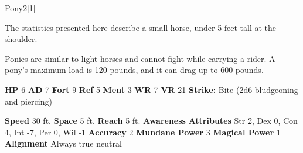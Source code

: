   \begin{monsection}{Pony}{2}[1]
    \vspace{-1em}\vspace{-1em}
    \vspace{0em}

    
      The statistics presented here describe a small horse, under 5 feet tall at the shoulder.
    
        Ponies are similar to light horses and cannot fight while carrying a rider.
        A pony's maximum load is 120 pounds, and it can drag up to 600 pounds.
      

    \begin{spellcontent}
      \begin{spelltargetinginfo}
        \pari \textbf{HP} 6 \monsep
          \textbf{AD} 7 \monsep
          \textbf{Fort} 9 \monsep
          \textbf{Ref} 5 \monsep
          \textbf{Ment} 3
        \pari \textbf{WR} 7 \monsep
        \textbf{VR} 21
        \pari \textbf{Strike:}
            Bite  (2d6 bludgeoning and piercing)
      \end{spelltargetinginfo}
    \end{spellcontent}
    \begin{monsterfooter}
      \pari \textbf{Speed} 30 ft. \monsep
        \textbf{Space} 5 ft. \monsep
        \textbf{Reach} 5 ft.
      \pari \textbf{Awareness} 
      \pari \textbf{Attributes}
        Str 2, Dex 0,
        Con 4, Int -7,
        Per 0, Wil -1
      \pari \textbf{Accuracy} 2 \monsep
        \textbf{Mundane Power} 3 \monsep
      \textbf{Magical Power} 1
      \pari \textbf{Alignment} Always true neutral
    \end{monsterfooter}
  \end{monsection}
  
